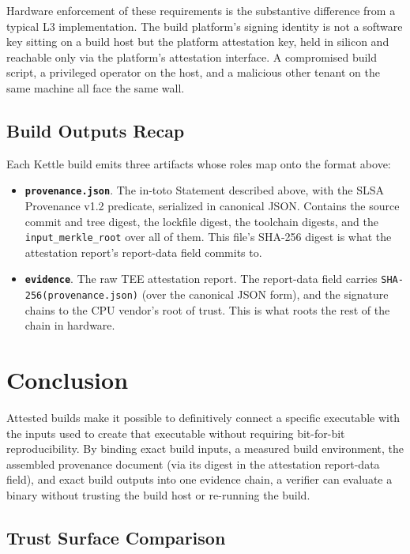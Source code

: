 \documentclass[11pt]{article}
\begin{document}
Hardware enforcement of these requirements is the substantive difference from a typical L3 implementation. The build platform's signing identity is not a software key sitting on a build host but the platform attestation key, held in silicon and reachable only via the platform's attestation interface. A compromised build script, a privileged operator on the host, and a malicious other tenant on the same machine all face the same wall.

\subsection{Build Outputs Recap}

Each Kettle build emits three artifacts whose roles map onto the format above:

\begingroup\sloppy
\begin{itemize}
\item \textbf{\texttt{provenance.json}}. The in-toto Statement described above, with the SLSA Provenance v1.2 predicate, serialized in canonical JSON. Contains the source commit and tree digest, the lockfile digest, the toolchain digests, and the \texttt{input\_merkle\_root} over all of them. This file's SHA-256 digest is what the attestation report's report-data field commits to.
\item \textbf{\texttt{evidence}}. The raw TEE attestation report. The report-data field carries \texttt{SHA-256(provenance.json)} (over the canonical JSON form), and the signature chains to the CPU vendor's root of trust. This is what roots the rest of the chain in hardware.
\end{itemize}
\endgroup

\section{Conclusion}

Attested builds make it possible to definitively connect a specific executable with the inputs used to create that executable without requiring bit-for-bit reproducibility. By binding exact build inputs, a measured build environment, the assembled provenance document (via its digest in the attestation report-data field), and exact build outputs into one evidence chain, a verifier can evaluate a binary without trusting the build host or re-running the build.

\subsection{Trust Surface Comparison}
\end{document}
